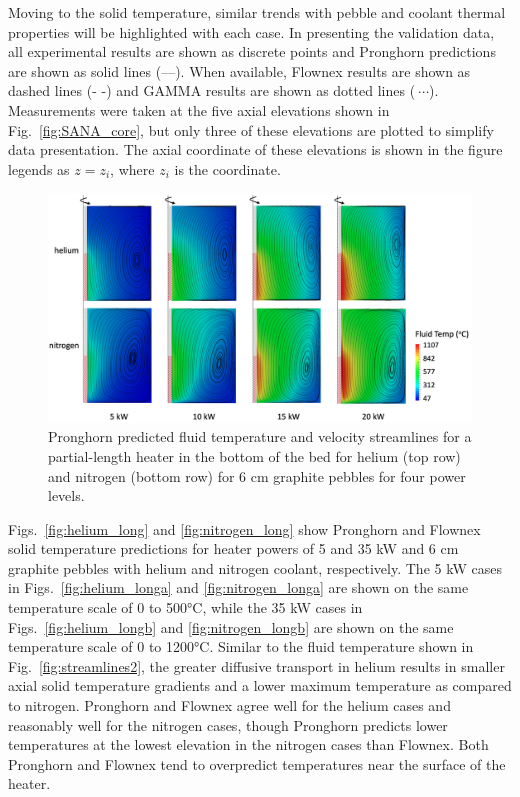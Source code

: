 Moving to the solid temperature, similar trends with pebble and coolant thermal properties will be highlighted with each case. In presenting the validation data, all experimental results are shown as discrete points and Pronghorn predictions are shown as solid lines (---). When available, Flownex results are shown as dashed lines (- -) and GAMMA results are shown as dotted lines ($\ \cdots$). Measurements were taken at the five axial elevations shown in Fig.\ \ref{fig:SANA_core}, but only three of these elevations are plotted to simplify data presentation. The axial coordinate of these elevations is shown in the figure legends as $z=z_i$, where $z_i$ is the coordinate.

\begin{figure}[h!]
\centering
\centerline{
\includegraphics[height=0.6\linewidth]{figs/sana_bottom_vel.png}}
\caption{Pronghorn predicted fluid temperature and velocity streamlines for a partial-length heater in the bottom of the bed for helium (top row) and nitrogen (bottom row) for 6 \si{\centi\meter} graphite pebbles for four power levels.}
\label{fig:streamlines1}
\end{figure}

Figs.\ \ref{fig:helium_long} and \ref{fig:nitrogen_long} show Pronghorn and Flownex solid temperature predictions for heater powers of 5 and 35 \si{\kilo\watt} and 6 \si{\centi\meter} graphite pebbles with helium and nitrogen coolant, respectively. The 5 \si{\kilo\watt} cases in Figs.\ \ref{fig:helium_longa} and \ref{fig:nitrogen_longa} are shown on the same temperature scale of 0 to 500\si{\celsius}, while the 35 \si{\kilo\watt} cases in Figs.\ \ref{fig:helium_longb} and \ref{fig:nitrogen_longb} are shown on the same temperature scale of 0 to 1200\si{\celsius}. Similar to the fluid temperature shown in Fig.\ \ref{fig:streamlines2}, the greater diffusive transport in helium results in smaller axial solid temperature gradients and a lower maximum temperature as compared to nitrogen. Pronghorn and Flownex agree well for the helium cases and reasonably well for the nitrogen cases, though Pronghorn predicts lower temperatures at the lowest elevation in the nitrogen cases than Flownex. Both Pronghorn and Flownex tend to overpredict temperatures near the surface of the heater.

